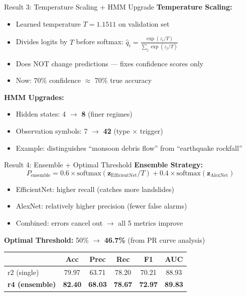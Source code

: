 \documentclass[aspectratio=169]{beamer}
\begin{document}
\begin{frame}{Result 3: Temperature Scaling + HMM Upgrade}
    \textbf{Temperature Scaling:}
    \begin{itemize}
        \item Learned temperature $T = 1.1511$ on validation set
        \item Divides logits by $T$ before softmax: $\hat{q}_i = \frac{\exp(z_i/T)}{\sum_j \exp(z_j/T)}$
        \item Does NOT change predictions --- fixes confidence scores only
        \item Now: 70\% confidence $\approx$ 70\% true accuracy
    \end{itemize}

    \vspace{0.3cm}
    \textbf{HMM Upgrades:}
    \begin{itemize}
        \item Hidden states: 4 $\to$ \textbf{8} (finer regimes)
        \item Observation symbols: 7 $\to$ \textbf{42} (type $\times$ trigger)
        \item Example: distinguishes ``monsoon debris flow'' from ``earthquake rockfall''
    \end{itemize}
\end{frame}

\begin{frame}{Result 4: Ensemble + Optimal Threshold}
    \textbf{Ensemble Strategy:}
    \[
    P_{\text{ensemble}} = 0.6 \times \text{softmax}(\mathbf{z}_{\text{EfficientNet}} / T) + 0.4 \times \text{softmax}(\mathbf{z}_{\text{AlexNet}})
    \]

    \begin{itemize}
        \item EfficientNet: higher recall (catches more landslides)
        \item AlexNet: relatively higher precision (fewer false alarms)
        \item Combined: errors cancel out $\to$ all 5 metrics improve
    \end{itemize}

    \vspace{0.3cm}
    \textbf{Optimal Threshold:} 50\% $\to$ \textbf{46.7\%} (from PR curve analysis)

    \vspace{0.2cm}
    \begin{table}
        \centering
        \small
        \begin{tabular}{lccccc}
            \toprule
            & Acc & Prec & Rec & F1 & AUC \\
            \midrule
            r2 (single) & 79.97 & 63.71 & 78.20 & 70.21 & 88.93 \\
            \textbf{r4 (ensemble)} & \textbf{82.40} & \textbf{68.03} & \textbf{78.67} & \textbf{72.97} & \textbf{89.83} \\
            \bottomrule
        \end{tabular}
    \end{table}
\end{frame}
\end{document}
